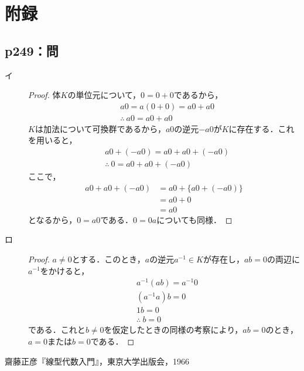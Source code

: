 \documentclass[uplatex,dvipdfmx,a4paper,11pt,fleqn]{jsarticle}
\begin{document}
\section*{附録\three}


\subsection*{p249：問}

\begin{tleftbar}
\begin{description}
    \item[イ] 
	\begin{proof}
		体$K$の単位元について，$0=0+0$であるから，
		\begin{align*}
			&a 0=a(0+0)=a0 + a0\\
			&\therefore ~ a0 = a0 + a0
		\end{align*}
		$K$は加法について可換群であるから，$a0$の逆元$-a0$が$K$に存在する．これを用いると，
\begin{align*}
	&a0 + (-a0) = a0 + a0 + (-a0) \\
	&\therefore ~ 0 = a0 + a0 +(-a0)
\end{align*}
 ここで，
 \begin{align*}
	a0 + a0 +(-a0)&=a0+ \{a0+(-a0)\} \\
	& = a0 + 0 \\
	& = a0
 \end{align*}
となるから，$0=a0$である．$0=0a$についても同様．
\end{proof}
\item[ロ]
\begin{proof}
        $a \ne 0$とする．このとき，$a$の逆元$a^{-1} \in K$が存在し，$ab=0$の両辺に$a^{-1}$をかけると，
        \begin{align*}
            &a^{-1} (ab) = a^{-1} 0 \\
            &(a^{-1}a)b =0 \\
            &1b =0 \\
            &\therefore~ b=0
        \end{align*}
        である．これと$b \ne 0$を仮定したときの同様の考察により，$ab=0$のとき，$a=0$または$b=0$である．
    \end{proof}
    \end{description}
\end{tleftbar}

\begin{thebibliography}{9}
	 齋藤正彦『線型代数入門』，東京大学出版会，1966
\end{thebibliography}
\end{document}
